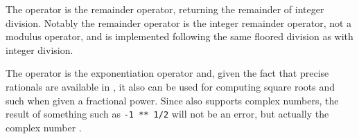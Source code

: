 The \op{\%} operator is the remainder operator, returning the remainder of
integer division. Notably the remainder operator is the integer remainder operator,
not a modulus operator, and is implemented following the same floored division
as with integer division.

The \op{**} operator is the exponentiation operator and, given the fact that
precise rationals are available in \Trilogy{}, it also can be used for computing
square roots and such when given a fractional power. Since \Trilogy{} also
supports complex numbers, the result of something such as \texttt{-1 ** 1/2}
will not be an error, but actually the complex number .

\begin{prooftree}
\end{prooftree}

\begin{prooftree}
\end{prooftree}

\begin{prooftree}
\end{prooftree}

\begin{prooftree}
\end{prooftree}

\begin{prooftree}
\end{prooftree}

\begin{prooftree}
\end{prooftree}


